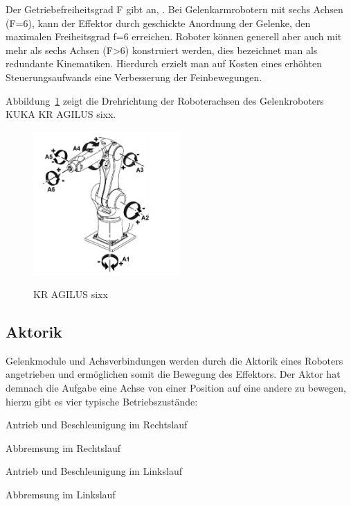 \documentclass[11pt,ngerman,parskip=half]{scrartcl}
\begin{document}
Der Getriebefreiheitsgrad F gibt an,
. Bei Gelenkarmrobotern mit sechs Achsen (F=6), kann der
Effektor durch geschickte Anordnung der Gelenke, den maximalen Freiheitsgrad
f=6 erreichen. Roboter können generell aber auch mit mehr als sechs Achsen
(F>6) konstruiert werden, dies bezeichnet man als redundante Kinematiken.
Hierdurch erzielt man auf Kosten eines erhöhten Steuerungsaufwands eine
Verbesserung der Feinbewegungen.
\parencite[vgl.][18]{weber_industrieroboter:_2017}

Abbildung~\ref{img:john4} zeigt die Drehrichtung der Roboterachsen des
Gelenkroboters KUKA KR AGILUS sixx.
\begin{figure}[H]
  \centering
  \includegraphics[width=0.5\textwidth]{src/img/john4.png}
  \caption{KR AGILUS sixx}
  \label{img:john4}
  \parencite{kuka_gmbh_kr_2018}
\end{figure}

\subsection{Aktorik}
\label{subsec:john_aktorik}
Gelenkmodule und Achsverbindungen werden durch die Aktorik eines Roboters
angetrieben und ermöglichen somit die Bewegung des Effektors. Der Aktor hat
demnach die Aufgabe eine Achse von einer Position auf eine andere zu bewegen,
hierzu gibt es vier typische Betriebszustände:
\begin{compactitem}
  \item Antrieb und Beschleunigung im Rechtslauf
  \item Abbremsung im Rechtslauf
  \item Antrieb und Beschleunigung im Linkslauf
  \item Abbremsung im Linkslauf
\end{compactitem}
\end{document}
